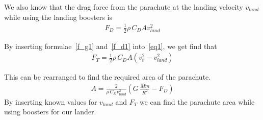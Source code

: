 \documentclass[reprint,english,notitlepage]{revtex4-2}
\begin{document}
We also know that the drag force from the parachute at the landing velocity $v_{land}$ while using the landing boosters is
\begin{align}
    F_D = \frac{1}{2}\rho \,C_D A v_{land}^2 \label{f_d1}
\end{align}

By inserting formulae~\ref{f_g1} and~\ref{f_d1} into~\ref{eq1}, we get find that
\begin{align}
    F_T = \frac{1}{2}\rho \,C_D A \left(v_t^2 - v_{land}^2 \right)
\end{align}

This can be rearranged to find the required area of the parachute.
\begin{align}
    A = \frac{2}{\rho \,C_D v_{land}^2}\left( G\,\frac{M m}{R^2} - F_D \right)
\end{align}
By inserting known values for $v_{land}$ and $F_T$ we can find the parachute area while using boosters for our lander.


\newpage
\printbibliography
\end{document}
